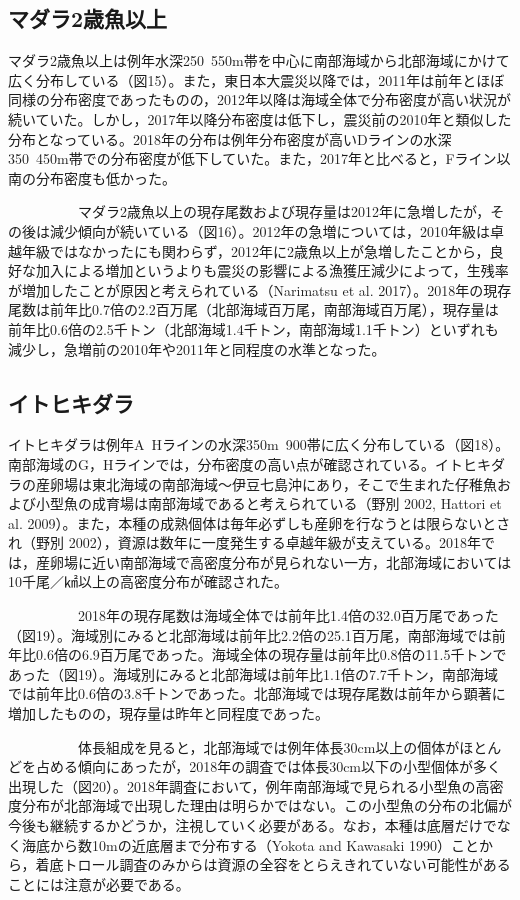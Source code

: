 \documentclass[11pt]{article} %
\begin{document}
\begin{linenumbers}
\subsection{マダラ2歳魚以上}
マダラ2歳魚以上は例年水深250~550m帯を中心に南部海域から北部海域にかけて広く分布している（図15）。また，東日本大震災以降では，2011年は前年とほぼ同様の分布密度であったものの，2012年以降は海域全体で分布密度が高い状況が続いていた。しかし，2017年以降分布密度は低下し，震災前の2010年と類似した分布となっている。2018年の分布は例年分布密度が高いDラインの水深350~450m帯での分布密度が低下していた。また，2017年と比べると，Fライン以南の分布密度も低かった。

\ \ \ \ \ \ \ \ \ \ 
マダラ2歳魚以上の現存尾数および現存量は2012年に急増したが，その後は減少傾向が続いている（図16）。2012年の急増については，2010年級は卓越年級ではなかったにも関わらず，2012年に2歳魚以上が急増したことから，良好な加入による増加というよりも震災の影響による漁獲圧減少によって，生残率が増加したことが原因と考えられている（Narimatsu et al. 2017）。2018年の現存尾数は前年比0.7倍の2.2百万尾（北部海域百万尾，南部海域百万尾），現存量は前年比0.6倍の2.5千トン（北部海域1.4千トン，南部海域1.1千トン）といずれも減少し，急増前の2010年や2011年と同程度の水準となった。

\subsection{イトヒキダラ}
イトヒキダラは例年A~Hラインの水深350m~900帯に広く分布している（図18）。南部海域のG，Hラインでは，分布密度の高い点が確認されている。イトヒキダラの産卵場は東北海域の南部海域～伊豆七島沖にあり，そこで生まれた仔稚魚および小型魚の成育場は南部海域であると考えられている（野別 2002, Hattori et al. 2009）。また，本種の成熟個体は毎年必ずしも産卵を行なうとは限らないとされ（野別 2002），資源は数年に一度発生する卓越年級が支えている。2018年では，産卵場に近い南部海域で高密度分布が見られない一方，北部海域においては10千尾／㎢以上の高密度分布が確認された。

\ \ \ \ \ \ \ \ \ \ 
2018年の現存尾数は海域全体では前年比1.4倍の32.0百万尾であった（図19）。海域別にみると北部海域は前年比2.2倍の25.1百万尾，南部海域では前年比0.6倍の6.9百万尾であった。海域全体の現存量は前年比0.8倍の11.5千トンであった（図19）。海域別にみると北部海域は前年比1.1倍の7.7千トン，南部海域では前年比0.6倍の3.8千トンであった。北部海域では現存尾数は前年から顕著に増加したものの，現存量は昨年と同程度であった。

\ \ \ \ \ \ \ \ \ \ 
体長組成を見ると，北部海域では例年体長30cm以上の個体がほとんどを占める傾向にあったが，2018年の調査では体長30cm以下の小型個体が多く出現した（図20）。2018年調査において，例年南部海域で見られる小型魚の高密度分布が北部海域で出現した理由は明らかではない。この小型魚の分布の北偏が今後も継続するかどうか，注視していく必要がある。なお，本種は底層だけでなく海底から数10mの近底層まで分布する（Yokota and Kawasaki 1990）ことから，着底トロール調査のみからは資源の全容をとらえきれていない可能性があることには注意が必要である。


\end{linenumbers}
\end{document}

